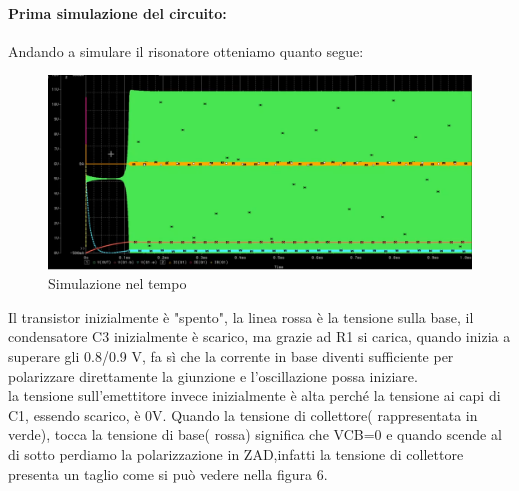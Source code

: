 \documentclass{article}
\begin{document}
\paragraph{Prima simulazione del circuito:}
Andando a simulare il risonatore otteniamo quanto segue:
~\begin{figure}[H]
\includegraphics[width=\textwidth]{RisonatoreSimulazione.png}
\centering
\caption{Simulazione nel tempo}
\label{fig:foo}
\end{figure}
Il transistor inizialmente è "spento", la linea rossa è la tensione sulla base, il condensatore C3 inizialmente è scarico, ma grazie ad R1 si carica, quando inizia a superare gli 0.8/0.9 V, fa sì che la corrente in base diventi sufficiente per polarizzare direttamente la giunzione e l'oscillazione possa iniziare.\\la tensione sull'emettitore invece inizialmente è alta perché la tensione ai capi di C1, essendo scarico, è 0V.
Quando la tensione di collettore( rappresentata in verde), tocca la tensione di base( rossa) significa che VCB=0  e quando scende al di sotto perdiamo la polarizzazione in ZAD,infatti  la tensione di collettore presenta un taglio come si può vedere nella figura 6.
\end{document}
